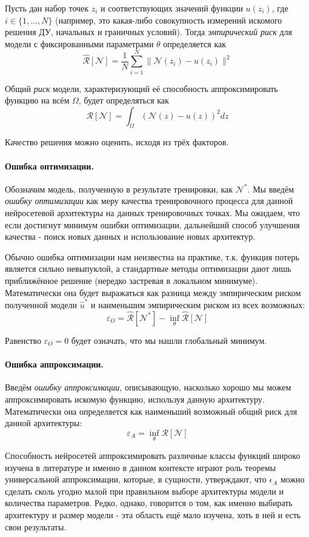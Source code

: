 \documentclass[a4paper, 12pt]{article}
\begin{document}
Пусть дан набор точек $z_i$ и соответствующих значений функции $u(z_i)$, где $i \in \{1, ..., N\}$ (например, это какая-либо совокупность измерений искомого решения ДУ, начальных и граничных условий). Тогда \textit{эмпирический риск} для модели с фиксированными параметрами $\theta$ определяется как
$$
\mathcal{\hat{R}}[\mathcal{N}] = \frac{1}{N}\sum_{i=1}^{N}\|\mathcal{N}(z_i) - u(z_i)\|^2
$$

Общий \textit{риск} модели, характеризующий её способность аппроксимировать функцию на всём $\Omega$, будет определяться как
$$
\mathcal{R}[\mathcal{N}] = \int_{\Omega}(\mathcal{N}(z) - u(z))^2dz
$$

Качество решения можно оценить, исходя из трёх факторов.

\paragraph{Ошибка оптимизации.} Обозначим модель, полученную в результате тренировки, как $\mathcal{N}^*$. Мы введём \textit{ошибку оптимизации} как меру качества тренировочного процесса для данной нейросетевой архитектуры на данных тренировочных точках. Мы ожидаем, что если достигнут минимум ошибки оптимизации, дальнейший способ улучшения качества - поиск новых данных и использование новых архитектур. 

Обычно ошибка оптимизации нам неизвестна на практике, т.к. функция потерь является сильно невыпуклой, а стандартные методы оптимизации дают лишь приближённое решение (нередко застревая в локальном минимуме). Математически она будет выражаться как разница между эмпирическим риском полученной модели $\hat{u}^*$ и наименьшим эмпирическим риском из всех возможных:
$$
\varepsilon_O = \mathcal{\hat{R}}[\mathcal{N}^*] - \inf_{\theta}\mathcal{\hat{R}}[\mathcal{N}]
$$

Равенство $\varepsilon_O = 0$ будет означать, что мы нашли глобальный минимум.

\paragraph{Ошибка аппроксимации.} Введём \textit{ошибку аппроксимации}, описывающую, насколько хорошо мы можем аппроксимировать искомую функцию, используя данную архитектуру. Математически она определяется как наименьший возможный общий риск для данной архитектуры:
$$
\varepsilon_A = \inf_{\theta}\mathcal{R}[\mathcal{N}]
$$

Способность нейросетей аппроксимировать различные классы функций широко изучена в литературе и именно в данном контексте играют роль теоремы универсальной аппроксимации, которые, в сущности, утверждают, что $\epsilon_A$ можно сделать сколь угодно малой при правильном выборе архитектуры модели и количества параметров. Редко, однако, говорится о том, как именно выбирать архитектуру и размер модели - эта область ещё мало изучена, хоть в ней и есть свои результаты.
\end{document}
